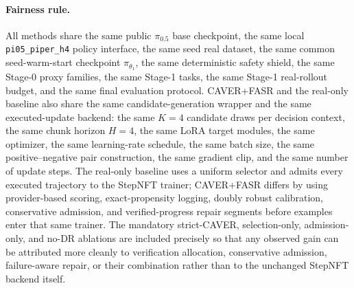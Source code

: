 \documentclass[10pt]{article}
\theoremstyle{plain}
\theoremstyle{definition}
\theoremstyle{remark}
\begin{document}
\paragraph{Fairness rule.}
All methods share the same public $\pi_{0.5}$ base checkpoint, the same local \texttt{pi05\_piper\_h4} policy interface, the same seed real dataset, the same common seed-warm-start checkpoint $\pi_{\theta_1}$, the same deterministic safety shield, the same Stage-0 proxy families, the same Stage-1 tasks, the same Stage-1 real-rollout budget, and the same final evaluation protocol. CAVER+FASR and the real-only baseline also share the same candidate-generation wrapper and the same executed-update backend: the same $K=4$ candidate draws per decision context, the same chunk horizon $H=4$, the same LoRA target modules, the same optimizer, the same learning-rate schedule, the same batch size, the same positive--negative pair construction, the same gradient clip, and the same number of update steps. The real-only baseline uses a uniform selector and admits every executed trajectory to the StepNFT trainer; CAVER+FASR differs by using provider-based scoring, exact-propensity logging, doubly robust calibration, conservative admission, and verified-progress repair segments before examples enter that same trainer. The mandatory strict-CAVER, selection-only, admission-only, and no-DR ablations are included precisely so that any observed gain can be attributed more cleanly to verification allocation, conservative admission, failure-aware repair, or their combination rather than to the unchanged StepNFT backend itself.
\end{document}
